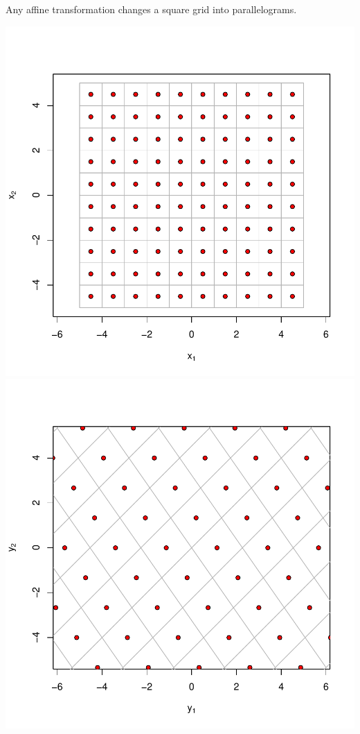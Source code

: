 \documentclass[landscape,footrule]{foils}
\renewcommand{\vec}[1]{\boldsymbol{#1}}
\begin{document}
Any affine transformation changes a square grid into parallelograms. \vspace*{-1cm}
\begin{center}
\includegraphics[scale=0.55]{original-grid.pdf}
\raisebox{4.0cm}{$\quad\xrightarrow{\vec{y}=A\vec{x}+\vec{\mu}}\quad$}
\includegraphics[scale=0.55]{transformed-grid.pdf}
\end{center}\vspace*{-1cm}
\end{document}
